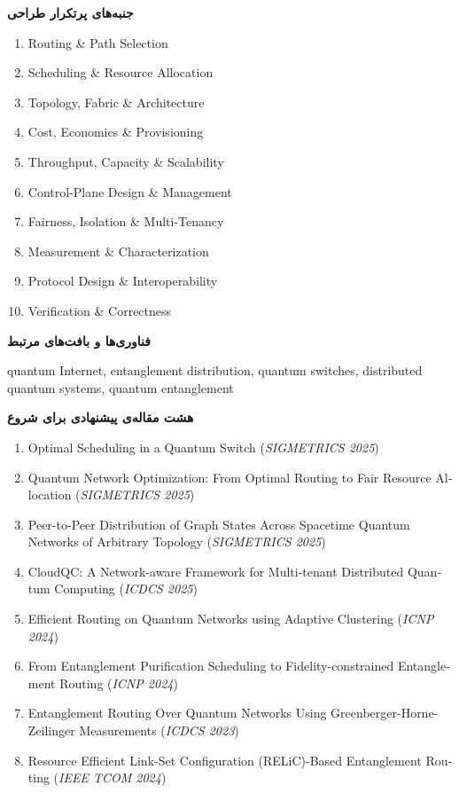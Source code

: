 \documentclass[12pt]{article}
\newcommand{\projectarea}[4]{%
\clearpage
\begin{tcolorbox}[
    colback=black!2,
    colframe=black!40,
    boxrule=0.5pt,
    arc=1mm,
    left=3mm,right=3mm,top=2mm,bottom=2mm,
    before skip=8pt,after skip=8pt
]
\linespread{1.08}\selectfont
\begin{latin}
\noindent{\large\bfseries #1}\par
\end{latin}
\smallskip
\textbf{جنبه‌های پرتکرار طراحی}\par
\vspace{1mm}
\begin{latin}
\small\raggedright
\begin{enumerate}[leftmargin=*,nosep,label=\arabic*.]
#2
\end{enumerate}
\end{latin}
\smallskip
\textbf{فناوری‌ها و بافت‌های مرتبط}\par
\begin{latin}
\small\raggedright #3\par
\end{latin}
\smallskip
\textbf{هشت مقاله‌ی پیشنهادی برای شروع}\par
\begin{latin}
\small\raggedright
\begin{enumerate}[leftmargin=*,nosep,label=\arabic*.]
#4
\end{enumerate}
\end{latin}
\end{tcolorbox}
}
\begin{document}
\projectarea{Quantum Networks}{
    \item Routing \& Path Selection
    \item Scheduling \& Resource Allocation
    \item Topology, Fabric \& Architecture
    \item Cost, Economics \& Provisioning
    \item Throughput, Capacity \& Scalability
    \item Control-Plane Design \& Management
    \item Fairness, Isolation \& Multi-Tenancy
    \item Measurement \& Characterization
    \item Protocol Design \& Interoperability
    \item Verification \& Correctness
}{quantum Internet, entanglement distribution, quantum switches, distributed quantum systems, quantum entanglement}{
\item Optimal Scheduling in a Quantum Switch (\textit{SIGMETRICS 2025})
\item Quantum Network Optimization: From Optimal Routing to Fair Resource Allocation (\textit{SIGMETRICS 2025})
\item Peer-to-Peer Distribution of Graph States Across Spacetime Quantum Networks of Arbitrary Topology (\textit{SIGMETRICS 2025})
\item CloudQC: A Network-aware Framework for Multi-tenant Distributed Quantum Computing (\textit{ICDCS 2025})
\item Efficient Routing on Quantum Networks using Adaptive Clustering (\textit{ICNP 2024})
\item From Entanglement Purification Scheduling to Fidelity-constrained Entanglement Routing (\textit{ICNP 2024})
\item Entanglement Routing Over Quantum Networks Using Greenberger-Horne-Zeilinger Measurements (\textit{ICDCS 2023})
\item Resource Efficient Link-Set Configuration (RELiC)-Based Entanglement Routing (\textit{IEEE TCOM 2024})
}
\end{document}
